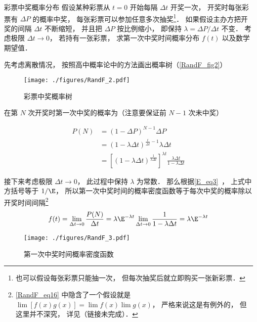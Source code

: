 \begin{example}{彩票中奖概率分布}
假设某种彩票从 $t = 0$ 开始每隔 $\Delta t$ 开奖一次， 开奖时每张彩票有 $\Delta P$ 的概率中奖， 每张彩票可以参加任意多次抽奖\footnote{也可以假设每张彩票只能抽一次， 但每次抽奖后就立即购买一张新彩票．}． 如果假设主办方把开奖的间隔 $\Delta t$ 不断缩短， 并且把 $\Delta P$ 按比例缩小， 即保持 $\lambda = {\Delta P}/{\Delta t}$ 不变． 考虑极限 $\Delta t\to 0$， 若持有一张彩票， 求第一次中奖时间概率分布 $f(t)$ 以及数学期望值．

先考虑离散情况， 按照高中概率论中的方法画出概率树（\autoref{RandF_fig2}）
\begin{figure}[ht]
\centering
\texttt{[image: ./figures/RandF\_2.pdf]}
\caption{彩票中奖概率树} \label{RandF_fig2}
\end{figure}
在第 $N$ 次开奖时第一次中奖的概率为（注意要保证前 $N-1$ 次未中奖）

\begin{equation}
\begin{aligned}
P(N) &= (1-\Delta P)^{N-1} \Delta P\\
&= (1-\lambda\Delta t)^{\frac{t}{\Delta t}-1} \lambda\Delta t\\
&= [(1-\lambda\Delta t)^{\frac{1}{\lambda\Delta t}}]^{\lambda t} \frac{\lambda\Delta t}{1-\lambda\Delta t}
\end{aligned}
\end{equation}

接下来考虑极限 $\Delta t\to 0$， 此过程中保持 $\lambda$ 为常数． 那么根据\autoref{E_eq3}~， 上式中方括号等于 $1/\E$， 所以第一次中奖时间的概率密度函数等于每次中奖的概率除以开奖时间间隔\footnote{\autoref{RandF_eq16} 中隐含了一个假设就是 $\lim [f(x)g(x)] = \lim f(x) \lim g(x)$， 严格来说这是有例外的， 但这里并不深究， 详见（链接未完成）．}
\begin{equation}\label{RandF_eq16}
f(t) = \lim_{\Delta t\to 0} \frac{P(N)}{\Delta t} = \lambda\E^{-\lambda t}\lim_{\Delta t\to 0} \frac{1}{1-\lambda\Delta t} = \lambda\E^{-\lambda t}
\end{equation}


\begin{figure}[ht]
\centering
\texttt{[image: ./figures/RandF\_3.pdf]}
\caption{第一次中奖时间概率密度函数} \label{RandF_fig3}
\end{figure}


\end{example}
